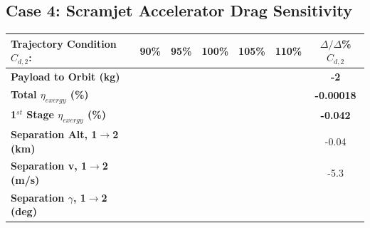 \subsection{Case 4: Scramjet Accelerator Drag Sensitivity}\label{sec:dragvariation}

\begin{table}[ht!] %
	\centering
	\begin{tabular}{l c c c c c c} 
		\hline \textbf{Trajectory Condition}   \qquad  $C_{d,2}$: 
		&90\%
		&95\%
		&100\%
		&105\%
		&110\%
		& $\Delta/\Delta$\%$C_{d,2}$
		\\
		\hline \textbf{Payload to Orbit (kg)}
		& \textbf{\PayloadToOrbitCdNinetyNoReturn}
		& \textbf{\PayloadToOrbitCdNinetyFiveNoReturn}
		& \textbf{\PayloadToOrbitCdStandardNoReturn}
		& \textbf{\PayloadToOrbitCdOneHundredFiveNoReturn}
		& \textbf{\PayloadToOrbitCdOneHundredTenNoReturn}
		&\textbf{-2}
		\\
		\textbf{Total $\eta_{exergy}$ (\%)}
		& \textbf{\totalExergyEffCdNinetyNoReturn}
		& \textbf{\totalExergyEffCdNinetyFiveNoReturn}
		& \textbf{\totalExergyEffCdStandardNoReturn}
		& \textbf{\totalExergyEffCdOneHundredFiveNoReturn}
		& \textbf{\totalExergyEffCdOneHundredTenNoReturn}
		& \textbf{-0.00018}
		\\
		\hline 
		\textbf{1$^{st}$ Stage $\eta_{exergy}$ (\%)}
		& \textbf{\firstExergyEffCdNinetyNoReturn}
		& \textbf{\firstExergyEffCdNinetyFiveNoReturn}
		& \textbf{\firstExergyEffCdStandardNoReturn}
		& \textbf{\firstExergyEffCdOneHundredFiveNoReturn}
		& \textbf{\firstExergyEffCdOneHundredTenNoReturn}
		& \textbf{-0.042}
		\\
		\textbf{Separation Alt, 1$\rightarrow$2 (km)}
		& \firstsecondSeparationAltCdNinetyNoReturn
		& \firstsecondSeparationAltCdNinetyFiveNoReturn
		& \firstsecondSeparationAltCdStandardNoReturn
		& \firstsecondSeparationAltCdOneHundredFiveNoReturn
		& \firstsecondSeparationAltCdOneHundredTenNoReturn
		&-0.04
		\\
		\textbf{Separation v, 1$\rightarrow$2 (m/s)}
		& \firstsecondSeparationvCdNinetyNoReturn
		& \firstsecondSeparationvCdNinetyFiveNoReturn
		& \firstsecondSeparationvCdStandardNoReturn
		& \firstsecondSeparationvCdOneHundredFiveNoReturn
		& \firstsecondSeparationvCdOneHundredTenNoReturn
		&-5.3
		\\
		\textbf{Separation $\gamma$, 1$\rightarrow$2 (deg)}
		& \firstsecondSeparationgammaCdNinetyNoReturn
		& \firstsecondSeparationgammaCdNinetyFiveNoReturn
		& \firstsecondSeparationgammaCdStandardNoReturn
		& \firstsecondSeparationgammaCdOneHundredFiveNoReturn

\end{tabular}
\end{table}
